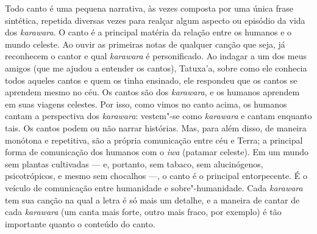 Todo canto é uma pequena narrativa, às vezes composta por uma única
frase sintética, repetida diversas vezes para realçar algum aspecto ou
episódio da vida dos \emph{karawara}. O canto é a principal matéria da
relação entre os humanos e o mundo celeste. Ao ouvir as primeiras notas
de qualquer canção que seja, já reconhecem o cantor e qual
\emph{karawara} é personificado. Ao indagar a um dos meus amigos (que me
ajudou a entender os cantos), Tatuxa'a, sobre como ele conhecia todos
aqueles cantos e quem os tinha ensinado, ele respondeu que os cantos se
aprendem mesmo no céu. Os cantos são dos \emph{karawara}, e os humanos
aprendem em suas viagens celestes. Por isso, como vimos no canto acima,
os humanos cantam a perspectiva dos \emph{karawara}: vestem"-se como
\emph{karawara} e cantam enquanto tais. Os cantos podem ou não narrar
histórias. Mas, para além disso, de maneira monótona e repetitiva, são a
própria comunicação entre céu e Terra; a principal forma de comunicação
dos humanos com o \emph{iwa} (patamar celeste). Em um mundo sem plantas
cultivadas --- e, portanto, sem tabaco, sem alucinógenos, psicotrópicos, e
mesmo sem chocalhos ---, o canto é o principal entorpecente. É o veículo
de comunicação entre humanidade e sobre"-humanidade. Cada \emph{karawara}
tem sua canção na qual a letra é só mais um detalhe, e a maneira de
cantar de cada \emph{karawara} (um canta mais forte, outro mais fraco,
por exemplo) é tão importante quanto o conteúdo do canto.

